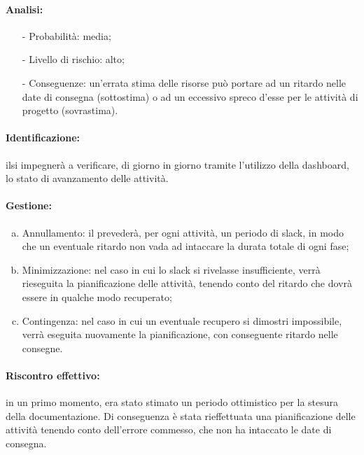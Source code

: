 \documentclass[../PianoProgetto.tex]{subfiles}
\begin{document}
	\paragraph*{Analisi:}
	\begin{itemize}
		\item[-] Probabilità: media;
		\item[-] Livello di rischio: alto;
		\item[-] Conseguenze: un’errata stima delle risorse può portare ad un ritardo nelle date di consegna (sottostima) o ad un eccessivo spreco d’esse per le attività di progetto (sovrastima).
	\end{itemize}
	
	\paragraph*{Identificazione:} il\responsabilediprogetto si impegnerà a verificare, di giorno in giorno tramite l’utilizzo della dashboard, lo stato di avanzamento delle attività.
	
	\paragraph*{Gestione:}
	\begin{enumerate}[(a)]
		\item Annullamento: il \responsabilediprogetto prevederà, per ogni attività, un periodo di slack, in modo che un eventuale ritardo non vada ad intaccare la durata totale di ogni fase;
		\item Minimizzazione: nel caso in cui lo slack si rivelasse insufficiente, verrà rieseguita la pianificazione delle attività, tenendo conto del ritardo che dovrà essere in qualche modo recuperato;
		\item Contingenza: nel caso in cui un eventuale recupero si dimostri impossibile, verrà eseguita nuovamente la pianificazione, con conseguente ritardo nelle consegne.
	\end{enumerate}	
	
	\paragraph*{Riscontro effettivo:} in un primo momento, era stato stimato un periodo ottimistico per la stesura della documentazione. Di conseguenza è stata rieffettuata una pianificazione delle attività tenendo conto dell’errore commesso, che non ha intaccato le date di consegna.
\end{document}
